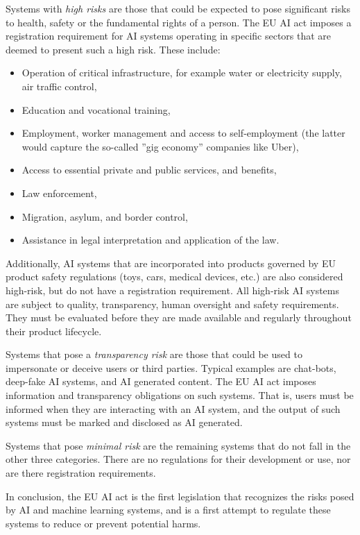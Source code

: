 Systems with \emph{high risks} are those that could be expected to pose significant risks to health, safety or the fundamental rights of a person. The EU AI act imposes a registration requirement for AI systems operating in specific sectors that are deemed to present such a high risk. These include: 
\begin{itemize}
  \item Operation of critical infrastructure, for example water or electricity supply, air traffic control,
  \item Education and vocational training,
  \item Employment, worker management and access to self-employment (the latter would capture the so-called ''gig economy'' companies like Uber),
  \item Access to essential private and public services, and benefits,
  \item Law enforcement,
  \item Migration, asylum, and border control,
  \item Assistance in legal interpretation and application of the law.
\end{itemize}

Additionally, AI systems that are incorporated into products governed by EU product safety regulations (toys, cars, medical devices, etc.) are also considered high-risk, but do not have a registration requirement. All high-risk AI systems are subject to quality, transparency, human oversight and safety requirements. They must be evaluated before they are made available and regularly throughout their product lifecycle.

Systems that pose a \emph{transparency risk} are those that could be used to impersonate or deceive users or third parties. Typical examples are chat-bots, deep-fake AI systems, and AI generated content. The EU AI act imposes information and transparency obligations on such systems. That is, users must be informed when they are interacting with an AI system, and the output of such systems must be marked and disclosed as AI generated. 

Systems that pose \emph{minimal risk} are the remaining systems that do not fall in the other three categories. There are no regulations for their development or use, nor are there registration requirements. 

In conclusion, the EU AI act is the first legislation that recognizes the risks posed by AI and machine learning systems, and is a first attempt to regulate these systems to reduce or prevent potential harms.


